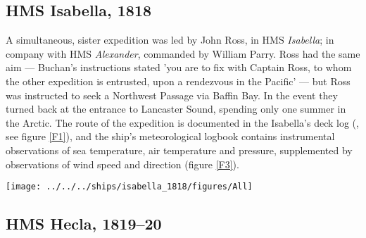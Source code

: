 \documentclass[CP]{copernicus}
\begin{document}
\subsection{HMS Isabella, 1818}

A simultaneous, sister expedition was led by John Ross, in HMS {\it Isabella}; in company with HMS {\it Alexander}, commanded by William Parry. Ross had the same aim --- Buchan's instructions stated 'you are to fix with Captain Ross, to whom the other expedition is entrusted, upon a rendezvous in the Pacific' \citep{buchan_1818} --- but Ross was instructed to seek a Northwest Passage via Baffin Bay. In the event they turned back at the entrance to Lancaster Sound, spending only one summer in the Arctic. The route of the expedition is documented in the Isabella's deck log (\citet{isabella_deck_log_1818}, see figure \ref{F1}), and the ship's meteorological logbook \citep{isabella_met_log_1818} contains instrumental observations of sea temperature, air temperature and pressure, supplemented by observations of wind speed and direction (figure \ref{F3}).
\begin{figure*}[!hbp]
\begin{center}
\texttt{[image: ../../../ships/isabella\_1818/figures/All]}
\caption{Weather observations from HMS {\it Isabella}, compared with modern values. The red points are the expedition's observations, the black and grey lines are the mean, max and min values from modern datasets (monthly averages interpolated to daily, 1979-2004; SST and sea-ice from \citet{rayner03HadISST1}, AT from \citet{rigor97poles}, and pressure from \citet{allan06meansealevelpressure}).}
\label{F3}
\end{center}
\end{figure*}

\subsection{HMS Hecla, 1819--20}
\end{document}
